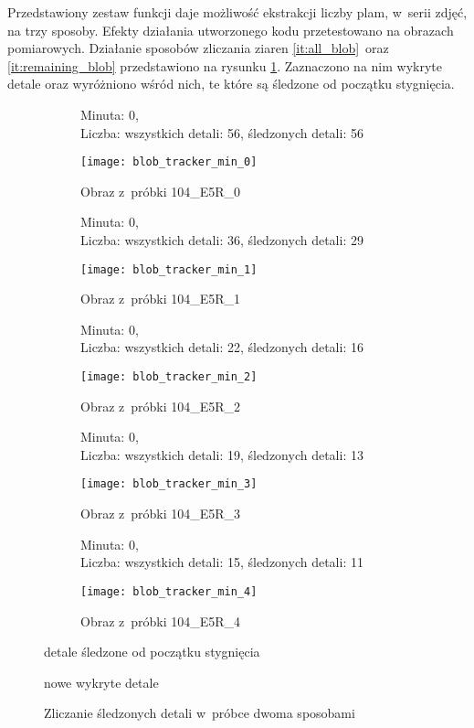 Przedstawiony zestaw funkcji daje możliwość ekstrakcji liczby plam, w~serii
zdjęć, na trzy sposoby.
Efekty działania utworzonego kodu przetestowano na obrazach pomiarowych.
Działanie sposobów zliczania ziaren \ref{it:all_blob}~oraz
\ref{it:remaining_blob} przedstawiono na rysunku \ref{fig:blob_count}.
Zaznaczono na nim wykryte detale oraz wyróżniono wśród nich, te które
są śledzone od początku stygnięcia.
\begin{figure}[htbp]
	\centering
	\hfill
	\begin{subfigure}[t]{0.45\textwidth}
		\centering
		\caption*{\scriptsize
			Minuta: 0, \\
			Liczba: wszystkich detali: 56, śledzonych detali: 56}
		\texttt{[image: blob\_tracker\_min\_0]}
		\caption{Obraz z~próbki 104\_E5R\_0}
	\end{subfigure}
	\hfill
	\begin{subfigure}[t]{0.45\textwidth}
		\centering
		\caption*{\scriptsize
			Minuta: 0, \\
			Liczba: wszystkich detali: 36, śledzonych detali: 29}
		\texttt{[image: blob\_tracker\_min\_1]}
		\caption{Obraz z~próbki 104\_E5R\_1}
	\end{subfigure}
	\hfill
	\vfill
	\hfill
	\begin{subfigure}[t]{0.45\textwidth}
		\centering
		\caption*{\scriptsize
			Minuta: 0, \\
			Liczba: wszystkich detali: 22, śledzonych detali: 16}
		\texttt{[image: blob\_tracker\_min\_2]}
		\caption{Obraz z~próbki 104\_E5R\_2}
	\end{subfigure}
	\hfill
	\begin{subfigure}[t]{0.45\textwidth}
		\centering
		\caption*{\scriptsize
			Minuta: 0, \\
			Liczba: wszystkich detali: 19, śledzonych detali: 13}
		\texttt{[image: blob\_tracker\_min\_3]}
		\caption{Obraz z~próbki 104\_E5R\_3}
	\end{subfigure}
	\hfill
	\vfill
	\begin{subfigure}[t]{0.45\textwidth}
		\centering
		\caption*{\scriptsize
			Minuta: 0, \\
			Liczba: wszystkich detali: 15, śledzonych detali: 11}
		\texttt{[image: blob\_tracker\_min\_4]}
		\caption{Obraz z~próbki 104\_E5R\_4}
	\end{subfigure}
	\begin{description} \footnotesize
		\centering
		\item[Kolor czerwony] detale śledzone od początku stygnięcia
		\item[Kolor niebieski] nowe wykryte detale
	\end{description}
	\caption{Zliczanie śledzonych detali w~próbce dwoma sposobami}
	\label{fig:blob_count}
\end{figure}


